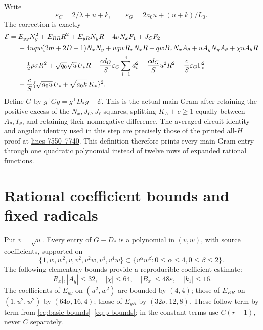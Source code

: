 \documentclass[11pt]{article}
\newcommand{\eps}{\varepsilon}
\begin{document}
Write
\[
 \eps_C=2/\lambda+u+k,\qquad
 \eps_G=2a_0u+(u+k)/L_0.
\]
The correction is exactly
\begin{align*}
 \mathcal E={}&E_{yy}N_y^2+E_{RR}R^2+E_{yR}N_yR
                  -4\nu N_xF_1+J_CF_2\\
 &-4uqw(2m+2D+1)N_xN_y+uqwR_xN_xR
                 +qwB_xN_xA_\theta+uA_yN_yA_\theta+\chi uA_\theta R\\
 &-\tfrac12\rho\sigma R^2+\sqrt{q_0}\sqrt u\,U_*R
       -{cd_G\over S}\eps_C\sum_{i=1}^4d_i^2
       -{cd_G\over S}u^2R^2-{c\over S}\eps_G\Gamma_*^2\\
 &-{c\over S}\{\sqrt{a_0u}\,U_*+\sqrt{a_0k}\,K_*\}^2.
\end{align*}
Define $G$ by
$g^{\mathsf T}Gg=g^{\mathsf T}D_*g+\mathcal E$.
This is the actual main Gram after retaining the positive excess
of the $N_x,J_C,J_\ell$ squares, splitting $K_A+c\ge1$ equally
between $A_\theta,T_\theta$, and retaining their nonnegative
difference. The averaged circuit identity and angular identity
used in this step are precisely those of the printed all-$H$
proof at
\href{https://github.com/anubhav70747/q222-finite-sdp/blob/0c1ce2e15ed067a6845464e2468559cea5274f2c/latex/certificates/c1_short.tex#L7550-L7740}
{lines 7550--7740}. This definition therefore prints every main-Gram
entry through one quadratic polynomial instead of twelve rows of
expanded rational functions.

\section{Rational coefficient bounds and fixed radicals}

Put $v=\sqrt u$. Every entry of $G-D_*$ is a polynomial in
$(v,w)$, with source coefficients, supported on
\[
 \{1,w,w^2,v,v^2,v^2w,v^4,v^4w\}
 \subset\{v^\alpha w^\beta:0\le\alpha\le4,0\le\beta\le2\}.
\]
The following elementary bounds provide a reproducible coefficient
estimate:
\[
 |R_x|,|A_y|\le32,\quad |\chi|\le64,\quad
 |B_x|\le48\eps,\quad |k_1|\le16.
\]
The coefficients of $E_{yy}$ on $(u^2,w^2)$ are bounded by $(4,4)$;
those of $E_{RR}$ on $(1,u^2,w^2)$ by $(64\sigma,16,4)$;
those of $E_{yR}$ by $(32\sigma,12,8)$.
These follow term by term from \eqref{eq:basic-bounds}--\eqref{eq:p-bounds};
in the constant terms use $C(r-1)$, never $C$ separately.
\end{document}
